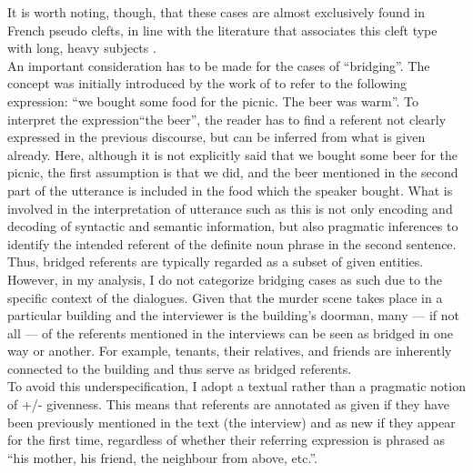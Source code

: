 It is worth noting, though, that these cases are almost exclusively found in French pseudo clefts, in line with the literature that associates this cleft type with long, heavy subjects \parencite{blanche1990franccais, roubaud1997sujet, calude2009cleft}.\\
An important consideration has to be made for the cases of ``bridging”. The concept was initially introduced by the work of \textcite{clark1977} to refer to the following expression: ``we bought some food for the picnic. The beer was warm”. To interpret the expression``the beer”, the reader has to find a referent not clearly expressed in the previous discourse, but can be inferred from what is given already. Here, although it is not explicitly said that we bought some beer for the picnic, the first assumption is that we did, and the beer mentioned in the second part of the utterance is included in the food which the speaker bought. What is involved in the interpretation of utterance such as this is not only encoding and decoding of syntactic and semantic information, but also pragmatic inferences to identify the intended referent of the definite noun phrase in the second sentence. \\
Thus, bridged referents are typically regarded as a subset of given entities. However, in my analysis, I do not categorize bridging cases as such due to the specific context of the dialogues. Given that the murder scene takes place in a particular building and the interviewer is the building's doorman, many — if not all — of the referents mentioned in the interviews can be seen as bridged in one way or another. For example, tenants, their relatives, and friends are inherently connected to the building and thus serve as bridged referents.\\
To avoid this underspecification, I adopt a textual rather than a pragmatic notion of +/- givenness. This means that referents are annotated as given if they have been previously mentioned in the text (the interview) and as new if they appear for the first time, regardless of whether their referring expression is phrased as ``his mother, his friend, the neighbour from above, etc.”.
 

